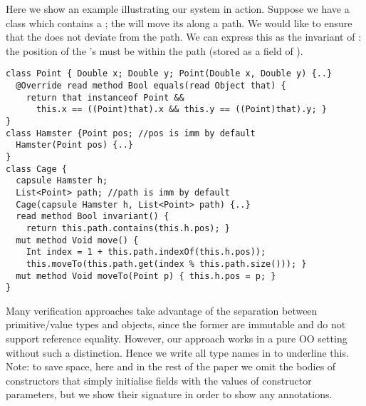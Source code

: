Here we show an example illustrating our system in action. Suppose we have a \Q@Cage@ class which contains a \Q@Hamster@; the \Q@Cage@ will move its \Q@Hamster@ along a path. We would like to ensure that the \Q@Hamster@ does not deviate from the path. We can express this as the invariant of \Q@Cage@: the position of the \Q@Cage@'s \Q@Hamster@ must be within the path (stored as a field of \Q@Cage@).

%
\begin{lstlisting}
class Point { Double x; Double y; Point(Double x, Double y) {..}
  @Override read method Bool equals(read Object that) {
    return that instanceof Point &&
      this.x == ((Point)that).x && this.y == ((Point)that).y; }
}
class Hamster {Point pos; //pos is imm by default
  Hamster(Point pos) {..} 
}
class Cage {
  capsule Hamster h;
  List<Point> path; //path is imm by default
  Cage(capsule Hamster h, List<Point> path) {..}
  read method Bool invariant() {
    return this.path.contains(this.h.pos); }
  mut method Void move() {
    Int index = 1 + this.path.indexOf(this.h.pos));
    this.moveTo(this.path.get(index % this.path.size())); }
  mut method Void moveTo(Point p) { this.h.pos = p; }
}
\end{lstlisting}

Many verification approaches take advantage of the separation between primitive/value types and objects, since the former are immutable and do not support reference equality.
However, our approach works in a pure OO setting without such a distinction. Hence we write all type names in \Q@BoldTitleCase@ to underline this. Note: to save space, here and in the rest of the paper we omit the bodies of constructors that simply initialise fields with the values of constructor parameters, but we show their signature in order to show any annotations.

